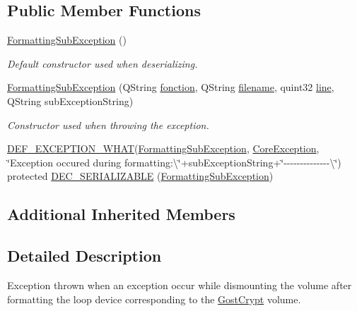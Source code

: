 \subsection*{Public Member Functions}
\begin{DoxyCompactItemize}
\item 
\hyperlink{class_gost_crypt_1_1_core_1_1_formatting_sub_exception_a920697d3a20fab80167a9b649c5aefc3}{Formatting\+Sub\+Exception} ()
\begin{DoxyCompactList}\small\item\em Default constructor used when deserializing. \end{DoxyCompactList}\item 
\hyperlink{class_gost_crypt_1_1_core_1_1_formatting_sub_exception_ad8d92026d9769d5d62dd08927d9d9b44}{Formatting\+Sub\+Exception} (Q\+String \hyperlink{class_gost_crypt_1_1_gost_crypt_exception_a29b8c93d5efbb1ff369107385725a939}{fonction}, Q\+String \hyperlink{class_gost_crypt_1_1_gost_crypt_exception_a749a12375f4ba9d502623b99d8252f38}{filename}, quint32 \hyperlink{class_gost_crypt_1_1_gost_crypt_exception_abf506d911f12a4e969eea500f90bd32c}{line}, Q\+String sub\+Exception\+String)
\begin{DoxyCompactList}\small\item\em Constructor used when throwing the exception. \end{DoxyCompactList}\item 
\hyperlink{_gost_crypt_exception_8h_a5bc1e1c6c9d6f46c84eeba49e33355f9}{D\+E\+F\+\_\+\+E\+X\+C\+E\+P\+T\+I\+O\+N\+\_\+\+W\+H\+AT}(\hyperlink{class_gost_crypt_1_1_core_1_1_formatting_sub_exception}{Formatting\+Sub\+Exception}, \hyperlink{class_gost_crypt_1_1_core_1_1_core_exception}{Core\+Exception}, \char`\"{}Exception occured during formatting\+:\textbackslash{}\char`\"{}+sub\+Exception\+String+\char`\"{}-\/-\/-\/-\/-\/-\/-\/-\/-\/-\/-\/-\/-\/-\/\textbackslash{}\char`\"{}) protected \hyperlink{class_gost_crypt_1_1_core_1_1_formatting_sub_exception_aa489d28a910cd10d5840570a1084603c}{D\+E\+C\+\_\+\+S\+E\+R\+I\+A\+L\+I\+Z\+A\+B\+LE} (\hyperlink{class_gost_crypt_1_1_core_1_1_formatting_sub_exception}{Formatting\+Sub\+Exception})
\end{DoxyCompactItemize}
\subsection*{Additional Inherited Members}


\subsection{Detailed Description}
Exception thrown when an exception occur while dismounting the volume after formatting the loop device corresponding to the \hyperlink{namespace_gost_crypt}{Gost\+Crypt} volume. 

